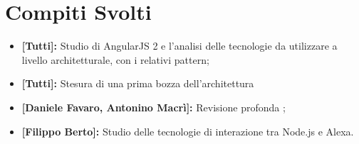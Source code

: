 \documentclass[../verbale-2017-02-16.tex]{subfiles}
\begin{document}
	\section{Compiti Svolti}
	\begin{itemize}
		\item \textbf{[Tutti]:} Studio di AngularJS 2 e l'analisi delle tecnologie da utilizzare a livello architetturale, con i relativi pattern;
		\item \textbf{[Tutti]:} Stesura di una prima bozza dell'architettura
		\item \textbf{[Daniele Favaro, Antonino Macrì]:}  Revisione profonda \analisideirequisitiRR;
		\item \textbf{[Filippo Berto]:} Studio delle tecnologie di interazione tra Node.js e Alexa.
	\end{itemize}
\end{document}
